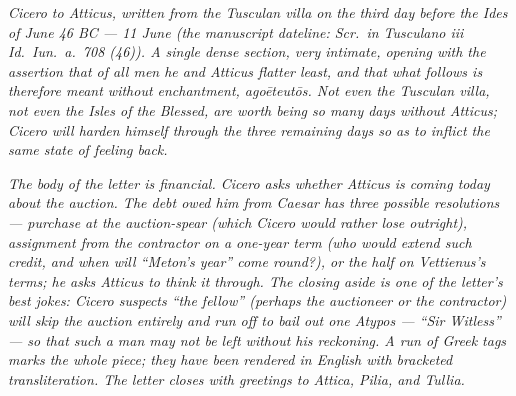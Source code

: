 
\textit{Cicero to Atticus, written from the Tusculan villa
on the third day before the Ides of June 46 BC --- 11 June
(the manuscript dateline: \textit{Scr.\ in Tusculano iii Id.\
Iun.\ a.\ 708 (46)}). A single dense section, very intimate,
opening with the assertion that of all men he and Atticus
flatter least, and that what follows is therefore meant
without enchantment, \textit{ago\=eteut\=os}. Not even the
Tusculan villa, not even the Isles of the Blessed, are worth
being so many days without Atticus; Cicero will harden himself
through the three remaining days so as to inflict the same
state of feeling back.}

\textit{The body of the letter is financial. Cicero asks
whether Atticus is coming today about the auction. The debt
owed him from Caesar has three possible resolutions ---
purchase at the auction-spear (which Cicero would rather lose
outright), assignment from the contractor on a one-year term
(who would extend such credit, and when will ``Meton's year''
come round?), or the half on Vettienus's terms; he asks
Atticus to think it through. The closing aside is one of the
letter's best jokes: Cicero suspects ``the fellow'' (perhaps
the auctioneer or the contractor) will skip the auction
entirely and run off to bail out one \textit{Atypos} ---
``Sir Witless'' --- so that such a man may not be left
without his reckoning. A run of Greek tags marks the whole
piece; they have been rendered in English with bracketed
transliteration. The letter closes with greetings to Attica,
Pilia, and Tullia.}
